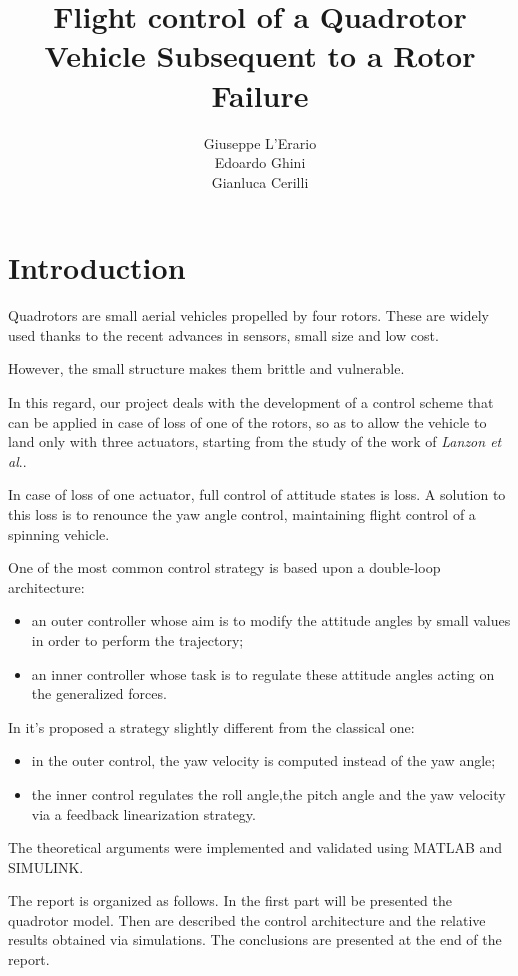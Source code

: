 \documentclass[11pt,a4paper]{scrartcl}
\author{Giuseppe L'Erario \\ Edoardo Ghini \\ Gianluca Cerilli}
\date{}
\title{Flight control of a Quadrotor Vehicle Subsequent to a Rotor Failure}
\begin{document}


\tableofcontents

\clearpage

\section*{Introduction}

Quadrotors are small aerial vehicles propelled by four rotors. 
These are widely used thanks to the recent advances in sensors, small size and low cost.

However, the small structure makes them brittle and vulnerable.

In this regard, our project deals with the development of a control scheme that can be applied in case of loss of one of the rotors, so as to allow the vehicle to land only with three actuators, starting from the study of the work of \emph{Lanzon et al}.\cite{lanzon2014flight}. 

In case of loss of one actuator, full control of attitude states is loss. A solution to this loss is to renounce the yaw angle control, maintaining flight control of a spinning vehicle.

One of the most common control strategy is based upon a double-loop architecture: 
\begin{itemize}
	\item an outer controller whose aim is to modify the attitude angles by small values in order to perform the trajectory;
	\item an inner controller whose task is to regulate these attitude angles acting on the generalized forces.
\end{itemize}

In \cite{lanzon2014flight} it's proposed a strategy slightly different from the classical one: 
\begin{itemize}
	\item in the outer control, the yaw velocity is computed instead of the yaw angle;
	\item the inner control regulates the roll angle,the pitch angle and the yaw velocity via a feedback linearization strategy\cite{isidori2013nonlinear}\cite{slotine1991applied}.
\end{itemize}

The theoretical arguments were implemented and validated using MATLAB and SIMULINK.

The report is organized as follows. In the first part will be presented the quadrotor model. Then are described the control architecture and the relative results obtained via simulations. The conclusions are presented at the end of the report.
\end{document}
